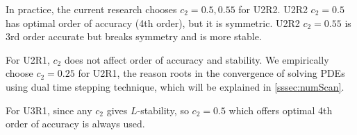 In practice, the current research chooses $c_2=0.5,0.55$ for U2R2.
U2R2 $c_2=0.5$ has optimal order of accuracy (4th order), but it is symmetric.
U2R2 $c_2=0.55$ is 3rd order accurate but breaks symmetry and is more stable.

For U2R1, $c_2$ does not affect order of accuracy and stability.
We empirically choose $c_2=0.25$ for U2R1, the reason roots in
the convergence of solving PDEs using
dual time stepping technique, which will be explained in \ref{sssec:numScan}.

For U3R1, since any $c_2$ gives $L$-stability, so $c_2=0.5$ which
offers optimal 4th order of accuracy is always used.








